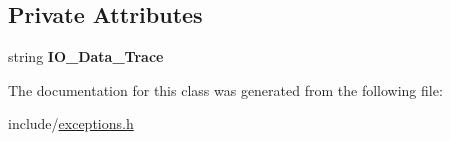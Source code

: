\subsection*{\-Private \-Attributes}
\begin{DoxyCompactItemize}
\item 
\hypertarget{classcIOExc_ad01c3157522f9c4bbb6caf7a551fc8de}{string {\bfseries \-I\-O\-\_\-\-Data\-\_\-\-Trace}}\label{d3/dbc/classcIOExc_ad01c3157522f9c4bbb6caf7a551fc8de}

\end{DoxyCompactItemize}


\-The documentation for this class was generated from the following file\-:\begin{DoxyCompactItemize}
\item 
include/\hyperlink{exceptions_8h}{exceptions.\-h}\end{DoxyCompactItemize}
